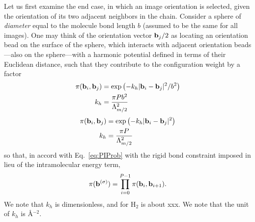         Let us first examine the end case, in which an image orientation is selected, given the orientation of its two adjacent neighbors in the chain. Consider a sphere of \emph{diameter} equal to the molecule bond length $b$ (assumed to be the same for all images). One may think of the orientation vector ${\mathbf {b}}_j/2$ as locating an orientation bead on the surface of the sphere, which interacts with adjacent orientation beads---also on the sphere---with a harmonic potential defined in terms of their Euclidean distance, such that they contribute to the configuration weight by a factor
        \ifkhExplicitP
            \begin{equation}
            \label{eq:piRigid}
                \begin{aligned}
                    \pi({\mathbf {b}}_i,{\mathbf {b}}_j) &= \exp\left(-k_h |{\mathbf {b}}_i - {\mathbf {b}}_j|^2/b^2\right)\\
                    k_h &=\frac{\pi P b^2}{\Lambda^2_{m/2}}\nonumber
                \end{aligned}
            \end{equation}
        \else
            \begin{equation}
            \label{eq:piRigid}
                \begin{aligned}
                    \pi({\mathbf {b}}_i,{\mathbf {b}}_j) &= \exp\left(-k_h |{\mathbf {b}}_i - {\mathbf {b}}_j|^2\right)\\
                    k_h &=\frac{\pi P}{\Lambda^2_{m/2}}\nonumber
                \end{aligned}
            \end{equation}
        \fi
        so that, in accord with Eq.~\ref{eq:PIProb} with the rigid bond constraint imposed in lieu of the intramolecular energy term,
        \begin{equation}
        \label{eq:piTotal}
            \pi({\mathbf {b}}^{(\sigma)}) = \prod_{i=0}^{P-1}\pi({\mathbf {b}}_i,{\mathbf {b}}_{i+1}).
        \end{equation}
        \ifkhExplicitP
            We note that $k_h$ is dimensionless, and for H$_2$ is about xxx.
        \else
            We note that the unit of $k_h$ is \AA$^{-2}$.
        \fi

